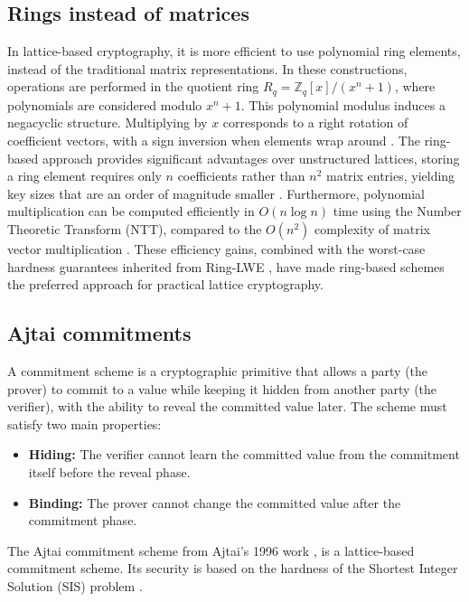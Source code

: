 \subsection{Rings instead of matrices}

In lattice-based cryptography, it is more efficient to use polynomial ring
elements, instead of the traditional matrix representations. In these
constructions, operations are performed in the quotient
ring $R_q = \mathbb{Z}_q[x]/(x^n + 1)$, where polynomials are considered
modulo $x^n + 1$. This polynomial modulus induces a negacyclic structure.
Multiplying by $x$ corresponds to a right rotation of coefficient vectors,
with a sign inversion when elements wrap around \cite{Lyubashevsky2013}. The
ring-based approach provides significant advantages over unstructured
lattices, storing a ring element requires only $n$ coefficients rather than
$n^2$ matrix entries, yielding key sizes that are an order of magnitude
smaller \cite{PeikertRingLWE}. Furthermore, polynomial multiplication can be
computed efficiently in $O(n \log n)$ time using the Number Theoretic
Transform (NTT), compared to the $O(n^2)$ complexity of matrix vector
multiplication \cite{Peikert2008}. These efficiency gains, combined with the
worst-case hardness guarantees inherited from Ring-LWE \cite{Peikert2008},
have made ring-based schemes the preferred approach for practical lattice
cryptography.

\subsection{Ajtai commitments}

A commitment scheme is a cryptographic primitive that allows a party (the
prover) to commit to a value while keeping it hidden from another party (the
verifier), with the ability to reveal the committed value later. The scheme
must satisfy two main properties:
\begin{itemize}
	\item \textbf{Hiding:} The verifier cannot learn the committed value from
	      the commitment itself before the reveal phase.
	\item \textbf{Binding:} The prover cannot change the committed value after
	      the commitment phase.
\end{itemize}

The Ajtai commitment scheme from Ajtai's 1996 work \cite{AjtaiLattices}, is a
lattice-based commitment scheme. Its security is based on the
hardness of the Shortest Integer Solution (SIS) problem \cite{AjtaiLattices, LatticeTutorial, MSIS}.

